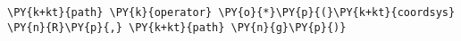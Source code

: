 \begin{Verbatim}[commandchars=\\\{\}]
    \PY{k+kt}{path} \PY{k}{operator} \PY{o}{*}\PY{p}{(}\PY{k+kt}{coordsys} \PY{n}{R}\PY{p}{,} \PY{k+kt}{path} \PY{n}{g}\PY{p}{)}
\end{Verbatim}
